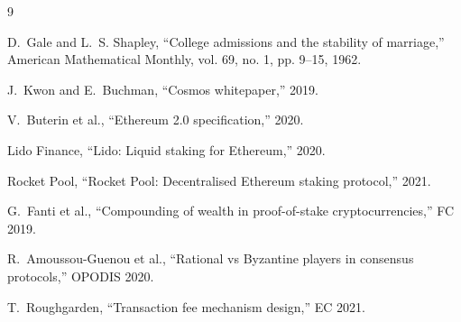 \documentclass[11pt,a4paper]{article}
\theoremstyle{definition}
\theoremstyle{remark}
\begin{document}

\begin{thebibliography}{9}

D.~Gale and L.~S. Shapley, ``College admissions and the stability of marriage,'' American Mathematical Monthly, vol. 69, no. 1, pp. 9--15, 1962.

J.~Kwon and E.~Buchman, ``Cosmos whitepaper,'' 2019.

V.~Buterin et al., ``Ethereum 2.0 specification,'' 2020.

Lido Finance, ``Lido: Liquid staking for Ethereum,'' 2020.

Rocket Pool, ``Rocket Pool: Decentralised Ethereum staking protocol,'' 2021.

G.~Fanti et al., ``Compounding of wealth in proof-of-stake cryptocurrencies,'' FC 2019.

R.~Amoussou-Guenou et al., ``Rational vs Byzantine players in consensus protocols,'' OPODIS 2020.

T.~Roughgarden, ``Transaction fee mechanism design,'' EC 2021.

\end{thebibliography}
\end{document}

